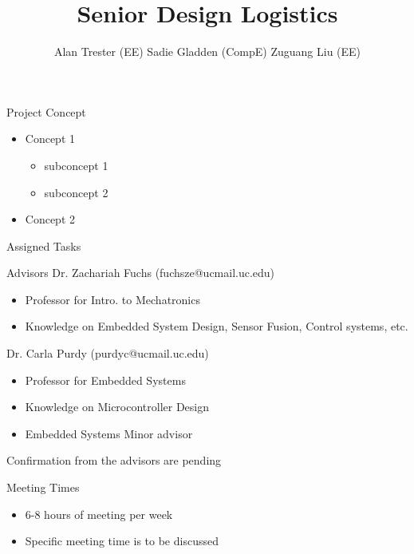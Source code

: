 \documentclass{beamer}
\title{Senior Design Logistics}
\author{Alan Trester (EE) Sadie Gladden (CompE) Zuguang Liu (EE)}
\begin{document}
	
\begin{frame}[plain]
    \maketitle
\end{frame}
\begin{frame}{Project Concept}
	\begin{itemize}
		\item Concept 1
			\begin{itemize}
				\item subconcept 1
				\item subconcept 2 
			\end{itemize}
		\item Concept 2
	\end{itemize}
\end{frame}

\begin{frame}{Assigned Tasks}
	
\end{frame}

\begin{frame}{Advisors}
	Dr. Zachariah Fuchs (fuchsze@ucmail.uc.edu)
	\begin{itemize}
		\item Professor for Intro. to Mechatronics
		\item Knowledge on Embedded System Design, Sensor Fusion, Control systems, etc.
	\end{itemize}
	Dr. Carla Purdy (purdyc@ucmail.uc.edu)
	\begin{itemize}
		\item Professor for Embedded Systems
		\item Knowledge on Microcontroller Design
		\item Embedded Systems Minor advisor
	\end{itemize}
	Confirmation from the advisors are pending
\end{frame}

\begin{frame}{Meeting Times}
	\begin{itemize}
		\item 6-8 hours of meeting per week
		\item Specific meeting time is to be discussed
	\end{itemize}
\end{frame}
\end{document}
